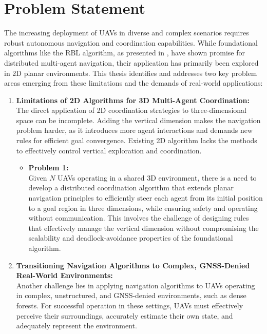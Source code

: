 \section{Problem Statement}
  The increasing deployment of \ac{UAV}s in diverse and complex scenarios requires robust autonomous navigation and coordination capabilities. 
  While foundational algorithms like the \ac{RBL} algorithm, as presented in \cite{rbl_paper}, have shown promise for distributed multi-agent navigation, their application has primarily been explored in 2D planar environments. 
  This thesis identifies and addresses two key problem areas emerging from these limitations and the demands of real-world applications:
  \begin{enumerate}
    \item \textbf{Limitations of 2D Algorithms for 3D Multi-Agent Coordination: } \\
      The direct application of 2D coordination strategies to three-dimensional space can be incomplete. 
      Adding the vertical dimension makes the navigation problem harder, as it introduces more agent interactions and demands new rules for efficient goal convergence.
      Existing 2D algorithm lacks the methods to effectively control vertical exploration and coordination.
      \begin{itemize}
        \item \textbf{Problem 1: } \\
        Given $N$ \ac{UAV}s operating in a shared 3D environment, there is a need to develop a distributed coordination algorithm that extends planar navigation principles to efficiently steer each agent from its initial position to a goal region in three dimensions, while ensuring safety and operating without communication. 
        This involves the challenge of designing rules that effectively manage the vertical dimension without compromising the scalability and deadlock-avoidance properties of the foundational algorithm.
      \end{itemize}
    \item \textbf{Transitioning Navigation Algorithms to Complex, GNSS-Denied Real-World Environments: } \\
      Another challenge lies in applying navigation algorithms to \ac{UAV}s operating in complex, unstructured, and GNSS-denied environments, such as dense forests. 
      For successful operation in these settings, \ac{UAV}s must effectively perceive their surroundings, accurately estimate their own state, and adequately represent the environment.

\end{enumerate}
